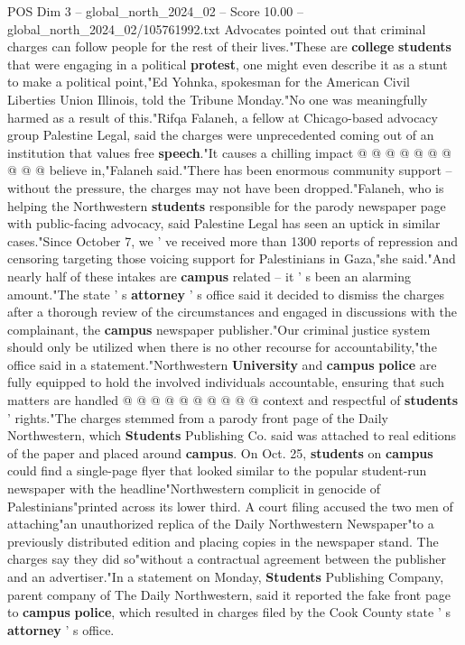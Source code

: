 \begin{textsample}{POS Dim 3 – global\_north\_2024\_02 – Score 10.00 – global\_north\_2024\_02/105761992.txt}
Advocates pointed out that criminal charges can follow people for the rest of their lives."These are \textbf{college} \textbf{students} that were engaging in a political \textbf{protest}, one might even describe it as a stunt to make a political point,"Ed Yohnka, spokesman for the American Civil Liberties Union Illinois, told the Tribune Monday."No one was meaningfully harmed as a result of this."Rifqa Falaneh, a fellow at Chicago-based advocacy group Palestine Legal, said the charges were unprecedented coming out of an institution that values free \textbf{speech}."It causes a chilling impact @ @ @ @ @ @ @ @ @ @ believe in,"Falaneh said."There has been enormous community support -- without the pressure, the charges may not have been dropped."Falaneh, who is helping the Northwestern \textbf{students} responsible for the parody newspaper page with public-facing advocacy, said Palestine Legal has seen an uptick in similar cases."Since October 7, we ' ve received more than 1300 reports of repression and censoring targeting those voicing support for Palestinians in Gaza,"she said."And nearly half of these intakes are \textbf{campus} related -- it ' s been an alarming amount."The state ' s \textbf{attorney} ' s office said it decided to dismiss the charges after a thorough review of the circumstances and engaged in discussions with the complainant, the \textbf{campus} newspaper publisher."Our criminal justice system should only be utilized when there is no other recourse for accountability,"the office said in a statement."Northwestern \textbf{University} and \textbf{campus} \textbf{police} are fully equipped to hold the involved individuals accountable, ensuring that such matters are handled @ @ @ @ @ @ @ @ @ @ context and respectful of \textbf{students} ' rights."The charges stemmed from a parody front page of the Daily Northwestern, which \textbf{Students} Publishing Co. said was attached to real editions of the paper and placed around \textbf{campus}.
On Oct. 25, \textbf{students} on \textbf{campus} could find a single-page flyer that looked similar to the popular student-run newspaper with the headline"Northwestern complicit in genocide of Palestinians"printed across its lower third.
A court filing accused the two men of attaching"an unauthorized replica of the Daily Northwestern Newspaper"to a previously distributed edition and placing copies in the newspaper stand.
The charges say they did so"without a contractual agreement between the publisher and an advertiser."In a statement on Monday, \textbf{Students} Publishing Company, parent company of The Daily Northwestern, said it reported the fake front page to \textbf{campus} \textbf{police}, which resulted in charges filed by the Cook County state ' s \textbf{attorney} ' s office.

\end{textsample}
